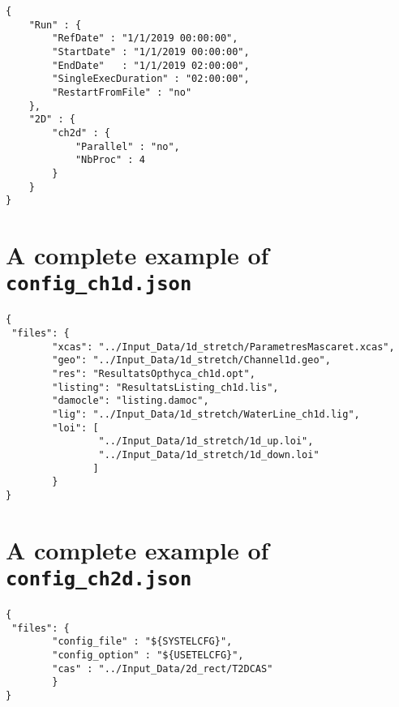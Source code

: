 \begin{verbatim}
{
    "Run" : {
        "RefDate" : "1/1/2019 00:00:00",
        "StartDate" : "1/1/2019 00:00:00",
        "EndDate"   : "1/1/2019 02:00:00",
        "SingleExecDuration" : "02:00:00",
        "RestartFromFile" : "no"
    },
    "2D" : {
        "ch2d" : {
            "Parallel" : "no",
            "NbProc" : 4
        }
    }
}
\end{verbatim}

\section{A complete example of
  \texttt{config\_ch1d.json}}\label{app:config_ch1d}

\begin{verbatim}
{
 "files": {
        "xcas": "../Input_Data/1d_stretch/ParametresMascaret.xcas",
        "geo": "../Input_Data/1d_stretch/Channel1d.geo",
        "res": "ResultatsOpthyca_ch1d.opt",
        "listing": "ResultatsListing_ch1d.lis",
        "damocle": "listing.damoc",
        "lig": "../Input_Data/1d_stretch/WaterLine_ch1d.lig",
        "loi": [
                "../Input_Data/1d_stretch/1d_up.loi",
                "../Input_Data/1d_stretch/1d_down.loi"
               ]
        }
}
\end{verbatim}

\section{A complete example of
  \texttt{config\_ch2d.json}}\label{app:config_ch2d}

\begin{verbatim}
{
 "files": {
        "config_file" : "${SYSTELCFG}",
        "config_option" : "${USETELCFG}",
        "cas" : "../Input_Data/2d_rect/T2DCAS"
        }
}
\end{verbatim}

